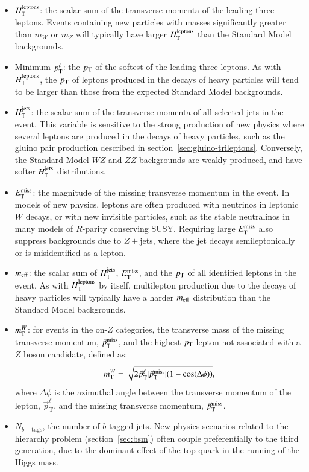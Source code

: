 \begin{itemize}
	\item $H_{\mathrm{T}}^{\mathrm{leptons}}$: the scalar sum of the transverse momenta of the leading three leptons. Events containing new particles with masses significantly greater than $m_W$ or $m_Z$ will typically have larger $H_{\mathrm{T}}^{\mathrm{leptons}}$ than the Standard Model backgrounds.
	\item Minimum $p_{\text{T}}^{\ell}$: the $p_{\text{T}}$ of the softest of the leading three leptons. As with $H_{\mathrm{T}}^{\mathrm{leptons}}$, the $p_{\text{T}}$ of leptons produced in the decays of heavy particles will tend to be larger than those from the expected Standard Model backgrounds.
	\item $H_{\mathrm{T}}^{\mathrm{jets}}$: the scalar sum of the transverse momenta of all selected jets in the event. This variable is sensitive to the strong production of new physics where several leptons are produced in the decays of heavy particles, such as the gluino pair production described in section~\ref{sec:gluino-trileptons}. Conversely, the Standard Model $WZ$ and $ZZ$ backgrounds are weakly produced, and have softer $H_{\mathrm{T}}^{\mathrm{jets}}$ distributions.
	\item $E_{\text{T}}^{\text{miss}}$: the magnitude of the missing transverse momentum in the event. In models of new physics, leptons are often produced with neutrinos in leptonic $W$ decays, or with new invisible particles, such as the stable neutralinos in many models of $R$-parity conserving SUSY. Requiring large $E_{\text{T}}^{\text{miss}}$ also suppress backgrounds due to $Z+$jets, where the jet decays semileptonically or is misidentified as a lepton. 
	\item $m_{\mathrm{eff}}$: the scalar sum of $H_{\mathrm{T}}^{\mathrm{jets}}$, $E_{\text{T}}^{\text{miss}}$, and the $p_{\text{T}}$ of all identified leptons in the event. As with $H_{\mathrm{T}}^{\mathrm{leptons}}$ by itself, multilepton production due to the decays of heavy particles will typically have a harder $m_{\mathrm{eff}}$ distribution than the Standard Model backgrounds.
	\item $m_{\mathrm{T}}^W$: for events in the on-$Z$ categories, the transverse mass of the missing transverse momentum, $\vec{p}_{\mathrm{T}}^{\mathrm{miss}}$, and the highest-$p_{\text{T}}$ lepton not associated with a $Z$ boson candidate, defined as:
	\begin{equation}
		m_{\mathrm{T}}^W = \sqrt{2 \vec{p}_{\mathrm{T}}^{\ell}|\vec{p}_{\mathrm{T}}^{\mathrm{miss}}|(1-\cos(\Delta\phi))},
	\end{equation}
	where $\Delta \phi$ is the azimuthal angle between the transverse momentum of the lepton, $\vec{p}_{\mathrm{T}}^{\ell}$, and the missing transverse momentum, $\vec{p}_{\mathrm{T}}^{\mathrm{miss}}$. 
	\item $N_{b-\mathrm{tags}}$, the number of $b$-tagged jets. New physics scenarios related to the hierarchy problem (section~\ref{sec:bsm}) often couple preferentially to the third generation, due to the dominant effect of the top quark in the running of the Higgs mass. 
\end{itemize}

